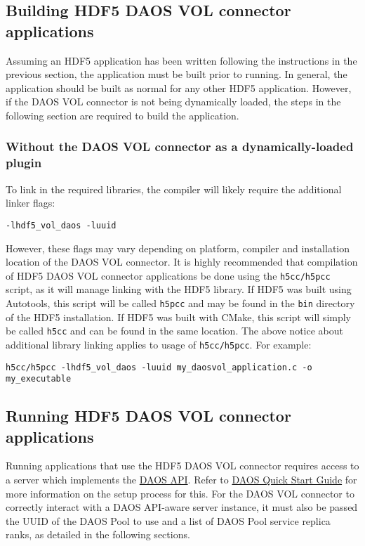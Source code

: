 \subsection{Building HDF5 DAOS VOL connector applications}

Assuming an HDF5 application has been written following the instructions in the previous section, the application must be built prior to running. In general, the application should be built as normal for any other HDF5 application. However, if the DAOS VOL connector is not being dynamically loaded, the steps in the following section are required to build the application.

\subsubsection{Without the DAOS VOL connector as a dynamically-loaded plugin}

To link in the required libraries, the compiler will likely require the additional linker flags:

\begin{verbatim}
-lhdf5_vol_daos -luuid
\end{verbatim}

However, these flags may vary depending on platform, compiler and installation location of the DAOS VOL connector. It is highly recommended that compilation of HDF5 DAOS VOL connector applications be done using the \texttt{h5cc/h5pcc} script, as it will manage linking with the HDF5 library. If HDF5 was built using Autotools, this script will be called \texttt{h5pcc} and may be found in the \texttt{bin} directory of the HDF5 installation. If HDF5 was built with CMake, this script will simply be called \texttt{h5cc} and can be found in the same location. The above notice about additional library linking applies to usage of \texttt{h5cc/h5pcc}. For example:

\begin{verbatim}
h5cc/h5pcc -lhdf5_vol_daos -luuid my_daosvol_application.c -o my_executable
\end{verbatim}

\newpage

\subsection{Running HDF5 DAOS VOL connector applications}
\label{running_daos_vol_apps}

Running applications that use the HDF5 DAOS VOL connector requires access to a server which implements the \href{https://github.com/daos-stack/daos/blob/master/src/include/daos_api.h}{DAOS API}. Refer to \href{https://github.com/daos-stack/daos/blob/master/doc/quickstart.md}{DAOS Quick Start Guide} for more information on the setup process for this. For the DAOS VOL connector to correctly interact with a DAOS API-aware server instance, it must also be passed the UUID of the DAOS Pool to use and a list of DAOS Pool service replica ranks, as detailed in the following sections.

